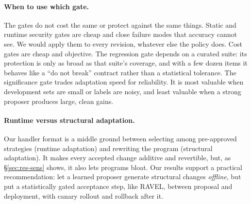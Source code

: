 \paragraph{When to use which gate.}
The gates do not cost the same or protect against the same things. Static and runtime security gates are
cheap and close failure modes that accuracy cannot see. We would apply them to every revision,
whatever else the policy does. Cost gates are cheap and objective. The regression gate depends on a
curated suite: its protection is only as broad as that suite's coverage, and with a few dozen items it
behaves like a ``do not break'' contract rather than a statistical tolerance. The significance gate trades
adaptation speed for reliability. It is most valuable when development sets are small or labels are noisy,
and least valuable when a strong proposer produces large, clean gains.

\paragraph{Runtime versus structural adaptation.}
Our handler format is a middle ground between selecting among pre-approved strategies (runtime
adaptation) and rewriting the program (structural adaptation). It makes every accepted change additive
and revertible, but, as \S\ref{sec:res-sens} shows, it also lets programs bloat. Our results support a
practical recommendation: let a learned proposer generate structural changes \emph{offline}, but put a
statistically gated acceptance step, like RAVEL, between proposal and deployment, with canary rollout
and rollback after it.


